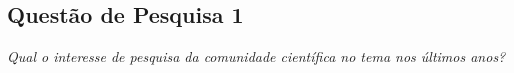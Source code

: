 
\subsection{Quest\~{a}o de Pesquisa 1}
\emph{Qual o interesse de pesquisa da comunidade científica no tema nos \'{u}ltimos anos?}